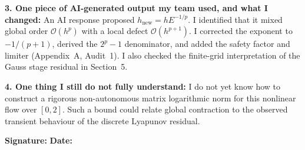 \begin{formbox}
\textbf{3. One piece of AI-generated output my team used, and what I changed:}
An AI response proposed $h_{\mathrm{new}}=hE^{-1/p}$. I identified that it
mixed global order $\mathcal{O}(h^p)$ with a local defect
$\mathcal{O}(h^{p+1})$. I corrected the exponent to $-1/(p+1)$, derived the
$2^p-1$ denominator, and added the safety factor and limiter (Appendix~A,
Audit~1). I also checked the finite-grid interpretation of the Gauss stage
residual in Section~5.

\textbf{4. One thing I still do not fully understand:}
I do not yet know how to construct a rigorous non-autonomous matrix logarithmic
norm for this nonlinear flow over $[0,2]$. Such a bound could relate global
contraction to the observed transient behaviour of the discrete Lyapunov
residual.

\textbf{Signature:} \underline{\hspace{4.5cm}} \hfill
\textbf{Date:} \underline{\hspace{2.5cm}}
\end{formbox}
\clearpage
